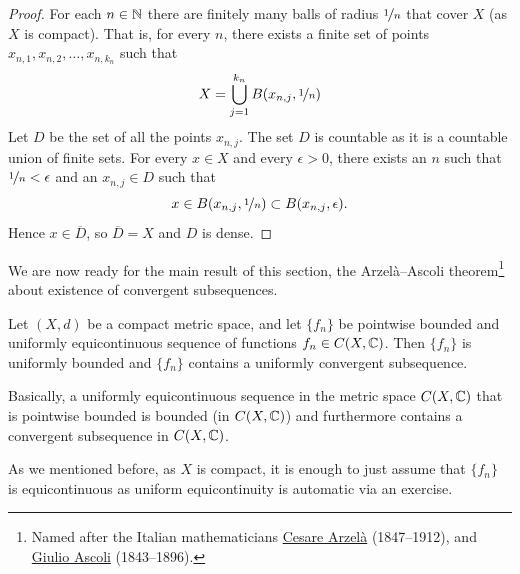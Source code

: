 \begin{proof}
For each $n \in {\mathbb{N}}$ there are finitely many
balls of radius $\nicefrac{1}{n}$ that cover $X$ (as $X$ is compact). That is,
for every $n$, there exists
a finite set of points $x_{n,1},x_{n,2},\ldots,x_{n,k_n}$ such that
\begin{equation*}
X= \bigcup_{j=1}^{k_n} B(x_{n,j},\nicefrac{1}{n})
\end{equation*}
Let $D$ be the set of all the points $x_{n,j}$.
The set $D$ is countable as it is a countable union of finite sets.
For every $x \in X$
and every $\epsilon > 0$, there exists an $n$ such that
$\nicefrac{1}{n} < \epsilon$ and an $x_{n,j} \in D$ such that
\begin{equation*}
x \in B(x_{n,j},\nicefrac{1}{n}) \subset B(x_{n,j},\epsilon) .
\end{equation*}
Hence $x \in \overline{D}$, so $\overline{D} = X$ and $D$ is dense.
\end{proof}

We are now ready for the main result of this section,
the Arzel\`a--Ascoli theorem\footnote{%
Named after the Italian mathematicians
\href{http://en.wikipedia.org/wiki/Cesare_Arzel\%C3\%A0}{Cesare Arzel\`a}
(1847--1912), and
\href{http://en.wikipedia.org/wiki/Giulio_Ascoli}{Giulio Ascoli}
(1843--1896).} about existence of convergent subsequences.

\begin{thm}
\label{thm:arzelaascoli}
Let $(X,d)$ be a compact metric space, and let $\{ f_n \}$
be pointwise bounded and uniformly equicontinuous sequence
of functions $f_n \in C(X,{\mathbb{C}})$.  Then
$\{f_n\}$ is uniformly bounded and $\{ f_n \}$ contains a uniformly
convergent subsequence.
\end{thm}

Basically, a uniformly equicontinuous sequence in the metric space
$C(X,{\mathbb{C}})$ that is pointwise bounded
is bounded (in $C(X,{\mathbb{C}})$) and furthermore contains a convergent
subsequence in $C(X,{\mathbb{C}})$.

As we mentioned before, as $X$ is compact, it is enough
to just assume that $\{ f_n \}$ is equicontinuous as
uniform equicontinuity is automatic via an exercise.

